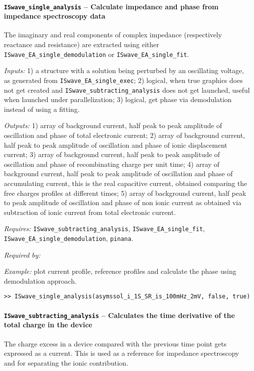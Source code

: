 	\paragraph{\texttt{ISwave\_single\_analysis} -- Calculate impedance and phase from impedance spectroscopy data}
	The imaginary and real components of complex impedance (respectively reactance and resistance) are extracted using either \texttt{ISwave\_EA\_single\_demodulation} or \texttt{ISwave\_EA\_single\_fit}.

	\textit{Inputs:} 1) a structure with a solution being perturbed by an
	oscillating voltage, as generated from \texttt{ISwave\_EA\_single\_exec};
	2) logical, when true graphics does not get created and
	\texttt{ISwave\_subtracting\_analysis} does not get launched, useful when
	launched under parallelization;
	3) logical, get phase via demodulation instead of using a fitting.

	\textit{Outputs:} 1) array of background current, half peak to peak amplitude of
	oscillation and phase of total electronic current;
	2) array of background current, half peak to peak amplitude of
	oscillation and phase of ionic displacement current;
	3) array of background current, half peak to peak amplitude of
	oscillation and phase of recombinating charge per unit time;
	4) array of background current, half peak to peak amplitude of
	oscillation and phase of accumulating current, this is the real
	capacitive current, obtained comparing the free charges profiles at
	different times;
	5) array of background current, half peak to peak amplitude of
	oscillation and phase of non ionic current as obtained via
	subtraction of ionic current from total electronic current.

	\textit{Requires:} \texttt{ISwave\_subtracting\_analysis}, \texttt{ISwave\_EA\_single\_fit}, \texttt{ISwave\_EA\_single\_demodulation}, \texttt{pinana}.

	\textit{Required by:}

	\textit{Example:} plot current profile, reference profiles and calculate the phase using demodulation approach.
	\begin{lstlisting}[style=Matlab-editor]
>> ISwave_single_analysis(asymssol_i_1S_SR_is_100mHz_2mV, false, true)
\end{lstlisting}

	\paragraph{\texttt{ISwave\_subtracting\_analysis} -- Calculates the time derivative of the total charge in the device}
	The charge excess in a device compared with the previous time point gets expressed as a current.
	This is used as a reference for impedance spectroscopy and for separating the ionic contribution.

